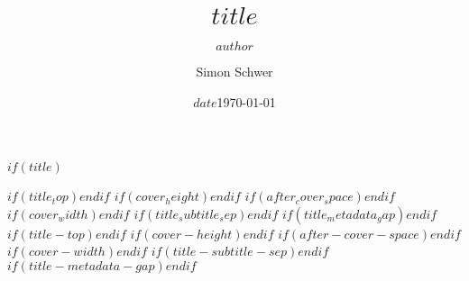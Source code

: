 \documentclass[11pt,a4paper]{article}
\title{$title$}
\author{$author$}
\author{Simon Schwer}
\date{$date$}
\date{\today}
\begin{document}
$if(title)$
\begin{titlepage}
\centering
\newlength{\CDPMTitleTop}
\newlength{\CDPMCoverHeight}
\newlength{\CDPMAfterCoverSpace}
\newlength{\CDPMCoverWidth}
\newlength{\CDPMTitleSubtitleSep}
\newlength{\CDPMTitleMetaGap}
\setlength{\CDPMTitleTop}{3.0cm}
\setlength{\CDPMCoverHeight}{6.0cm}
\setlength{\CDPMAfterCoverSpace}{1.0cm}
\setlength{\CDPMCoverWidth}{\paperwidth}
\setlength{\CDPMTitleSubtitleSep}{0.4cm}
\setlength{\CDPMTitleMetaGap}{0.6cm}
$if(title_top)$\setlength{\CDPMTitleTop}{$title_top$}$endif$
$if(cover_height)$\setlength{\CDPMCoverHeight}{$cover_height$}$endif$
$if(after_cover_space)$\setlength{\CDPMAfterCoverSpace}{$after_cover_space$}$endif$
$if(cover_width)$\setlength{\CDPMCoverWidth}{$cover_width$}$endif$
$if(title_subtitle_sep)$\setlength{\CDPMTitleSubtitleSep}{$title_subtitle_sep$}$endif$
$if(title_metadata_gap)$\setlength{\CDPMTitleMetaGap}{$title_metadata_gap$}$endif$
$if(title-top)$\setlength{\CDPMTitleTop}{$title-top$}$endif$
$if(cover-height)$\setlength{\CDPMCoverHeight}{$cover-height$}$endif$
$if(after-cover-space)$\setlength{\CDPMAfterCoverSpace}{$after-cover-space$}$endif$
$if(cover-width)$\setlength{\CDPMCoverWidth}{$cover-width$}$endif$
$if(title-subtitle-sep)$\setlength{\CDPMTitleSubtitleSep}{$title-subtitle-sep$}$endif$
$if(title-metadata-gap)$\setlength{\CDPMTitleMetaGap}{$title-metadata-gap$}$endif$


\end{titlepage}
\end{document}
